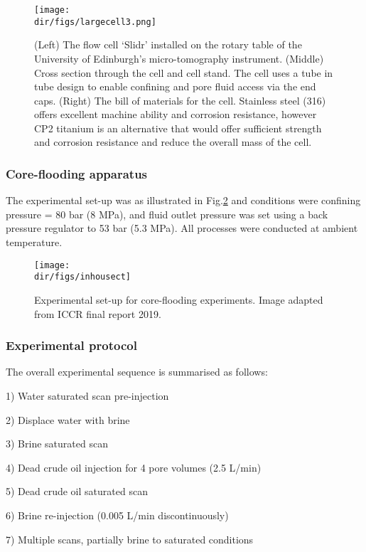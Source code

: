 \begin{figure}[htbp]
  \centering
  \texttt{[image: \\dir/figs/largecell3.png]}
  \caption{(Left) The flow cell ‘Slidr’ installed on the rotary table of the University of Edinburgh’s micro-tomography instrument. (Middle) Cross section through the cell and cell stand. The cell uses a tube in tube design to enable confining and pore fluid access via the end caps. (Right) The bill of materials for the cell. Stainless steel (316) offers excellent machine ability and corrosion resistance, however CP2 titanium is an alternative that would offer sufficient strength and corrosion resistance and reduce the overall mass of the cell.}
  \label{largecell3}
\end{figure}

\subsubsection{Core-flooding apparatus}
The experimental set-up was as illustrated in Fig.\ref{inhousect} and conditions were confining pressure = 80 bar (8 MPa), and fluid outlet pressure was set using a back pressure regulator to 53 bar (5.3 MPa). All processes were conducted at ambient temperature.

\begin{figure}[htbp]
  \centering
  \texttt{[image: \\dir/figs/inhousect]}
  \caption{Experimental set-up for core-flooding experiments. Image adapted from ICCR final report 2019.}
  \label{inhousect}
\end{figure}

\subsubsection{Experimental protocol}
The overall experimental sequence is summarised as follows: 

1) Water saturated scan pre-injection

2) Displace water with brine 

3) Brine saturated scan 

4) Dead crude oil injection for 4 pore volumes (2.5 \textmu L/min) 

5) Dead crude oil saturated scan 

6) Brine re-injection (0.005 \textmu L/min discontinuously)

7) Multiple scans, partially brine to saturated conditions

